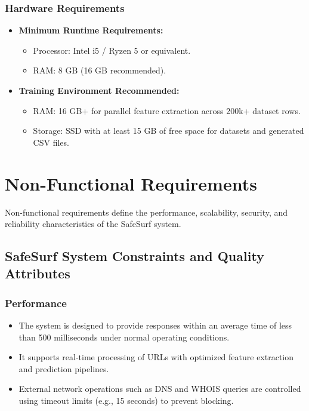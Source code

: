 \subsubsection*{Hardware Requirements}

\begin{itemize}
    \item \textbf{Minimum Runtime Requirements:}
    \begin{itemize}
        \item Processor: Intel i5 / Ryzen 5 or equivalent.
        \item RAM: 8 GB (16 GB recommended).
    \end{itemize}
    \item \textbf{Training Environment Recommended:}
    \begin{itemize}
        \item RAM: 16 GB+ for parallel feature extraction across 200k+ dataset rows.
        \item Storage: SSD with at least 15 GB of free space for datasets and generated CSV files.
    \end{itemize}
\end{itemize}

\section{Non-Functional Requirements}

Non-functional requirements define the performance, scalability, security, and reliability characteristics of the SafeSurf system.

\subsection{SafeSurf System Constraints and Quality Attributes}

\subsubsection*{Performance}

\begin{itemize}
    \item The system is designed to provide responses within an average time of less than 500 milliseconds under normal operating conditions.
    
    \item It supports real-time processing of URLs with optimized feature extraction and prediction pipelines.
    
    \item External network operations such as DNS and WHOIS queries are controlled using timeout limits (e.g., 15 seconds) to prevent blocking.
\end{itemize}

